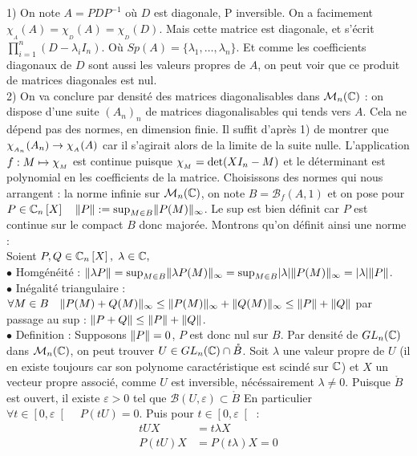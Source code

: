 \documentclass[letterpaper,10pt]{article}
\begin{document}
{
1) On note $A= PDP^{-1}$ où $D$ est diagonale, P inversible.
On a facimement $\chi_{_A}(A) = \chi_{_D}(A) = \chi_{_D}(D)$. 
Mais cette matrice est diagonale, et s'écrit $\prod_{i=1}^n(D-\lambda_i I_n)$. Où $Sp(A) = \{ \lambda _1,\ldots ,\lambda _n\}$. Et comme les coefficients diagonaux de $D$ sont aussi les valeurs propres de $A$, on peut voir que ce produit de matrices diagonales est nul.\\
2) On va conclure par densité des matrices diagonalisables dans $\mathcal{M}_n(\mathbb{C})$ : on dispose d'une suite $(A_n)_n$ de matrices diagonalisables qui tends vers $A$. Cela ne dépend pas des normes, en dimension finie. Il suffit d'après 1) de montrer que $\chi_{_{A_n}}(A_n) \to \chi_{_{A}}(A)$ car il s'agirait alors de la limite de la suite nulle.
L'application $f:M \mapsto \chi_{_{M}}$ est continue puisque $ \chi_{_{M}} = \mathrm{det}(XI_n-M)$ et le déterminant est polynomial en les coefficients de la matrice. Choisissons des normes qui nous arrangent : la norme infinie sur $\mathcal{M}_n(\mathbb{C})$, on note $B = \mathcal{B}_f(A,1)$ et on pose pour $P\in \mathbb{C}_n\left[X\right] \quad \|P\| := \mathrm{sup}_{M\in B}\|P(M)\|_{\infty}$. Le sup est bien définit car $P$ est continue sur le compact $B$ donc majorée. Montrons qu'on définit ainsi une norme : \\ 
Soient $P,Q \in \mathbb{C}_n\left[X\right],\; \lambda \in \mathbb{C}, $\\
$\bullet $ Homgénéité : $\|\lambda P\| = \mathrm{sup}_{M\in B}\|\lambda P(M)\|_{\infty}= \mathrm{sup}_{M\in B}|\lambda| \| P(M)\|_{\infty}= |\lambda|\|P\|$.\\
$\bullet$ Inégalité triangulaire :
$\forall M\in B \quad \|P(M)+Q(M)\|_{\infty}\leq \|P(M)\|_{\infty}+\|Q(M)\|_{\infty} \leq \|P\| + \|Q\| $ par passage au sup : $\|P+Q\|\leq \|P\| +\|Q\| $.\\
$\bullet$ Definition : Supposons $\|P\| =0$, $P$ est donc nul sur $B$. Par densité de $GL_n(\mathbb{C})$ dans $\mathcal{M}_n(\mathbb{C})$, on peut trouver $U \in GL_n(\mathbb{C}) \cap \mathring{B} $. Soit $\lambda$ une valeur propre de $U$ (il en existe toujours car son polynome caractéristique est scindé sur $\mathbb{C}$) et $X$ un vecteur propre associé, comme $U$ est inversible, nécéssairement $\lambda \neq 0$. Puisque $\mathring{B}$ est ouvert, il existe $\varepsilon >0 $ tel que $\mathcal{B}(U,\varepsilon)\subset \mathring{B}$ En particulier $\forall t\in \left[0,\varepsilon \right[ \quad P(tU) = 0$. Puis pour $t\in \left[0,\varepsilon \right[ $ : \begin{align*}
tUX &= t\lambda X\\
P(tU)X &= P(t\lambda)X = 0
\end{align*}
}
\end{document}
